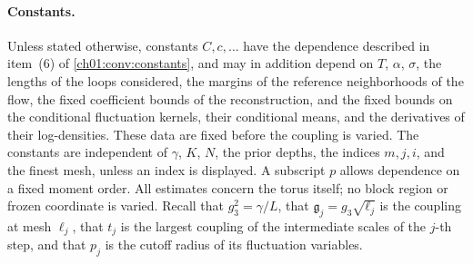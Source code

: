 \paragraph{Constants.} Unless stated otherwise, constants $C,c,\ldots$ have the dependence described in item~(6) of \cref{ch01:conv:constants}, and may in addition depend on $T$, $\alpha$, $\sigma$, the lengths of the loops considered, the margins of the reference neighborhoods of the flow, the fixed coefficient bounds of the reconstruction, and the fixed bounds on the conditional fluctuation kernels, their conditional means, and the derivatives of their log-densities. These data are fixed before the coupling is varied. The constants are independent of $\gamma$, $K$, $N$, the prior depths, the indices $m,j,i$, and the finest mesh, unless an index is displayed. A subscript $p$ allows dependence on a fixed moment order. All estimates concern the torus itself; no block region or frozen coordinate is varied. Recall that $g_3^2=\gamma/L$, that $\mathfrak g_j=g_3\sqrt{\ell_j}$ is the coupling at mesh $\ell_j$, that $t_j$ is the largest coupling of the intermediate scales of the $j$-th step, and that $p_j$ is the cutoff radius of its fluctuation variables.

